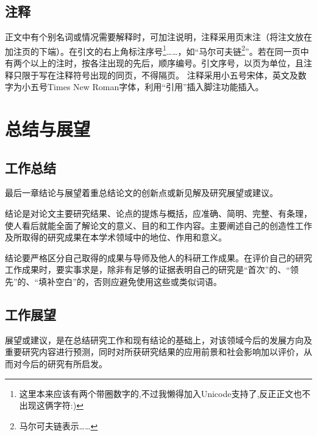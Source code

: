 \begin{spacing}{1.5}
    \subsection{注释}
    
    正文中有个别名词或情况需要解释时，可加注说明，注释采用页末注（将注文放在加注页的下端）。在引文的右上角标注序号\footnote{这里本来应该有两个带圈数字的,不过我懒得加入Unicode支持了,反正正文也不出现这俩字符:)}……，如“马尔可夫链\footnote{ 马尔可夫链表示……}”。若在同一页中有两个以上的注时，按各注出现的先后，顺序编号。引文序号，以页为单位，且注释只限于写在注释符号出现的同页，不得隔页。
    注释采用小五号宋体，英文及数字为小五号Times New Roman字体，利用“引用”插入脚注功能插入。
    
    \newpage
    \section{总结与展望}
    
    \subsection{工作总结}
    最后一章结论与展望着重总结论文的创新点或新见解及研究展望或建议。
    
    结论是对论文主要研究结果、论点的提炼与概括，应准确、简明、完整、有条理，使人看后就能全面了解论文的意义、目的和工作内容。主要阐述自己的创造性工作及所取得的研究成果在本学术领域中的地位、作用和意义。
    
    结论要严格区分自己取得的成果与导师及他人的科研工作成果。在评价自己的研究工作成果时，要实事求是，除非有足够的证据表明自己的研究是“首次”的、“领先”的、“填补空白”的，否则应避免使用这些或类似词语。
    
    \subsection{工作展望}
    
    展望或建议，是在总结研究工作和现有结论的基础上，对该领域今后的发展方向及重要研究内容进行预测，同时对所获研究结果的应用前景和社会影响加以评价，从而对今后的研究有所启发。
        
\end{spacing}
